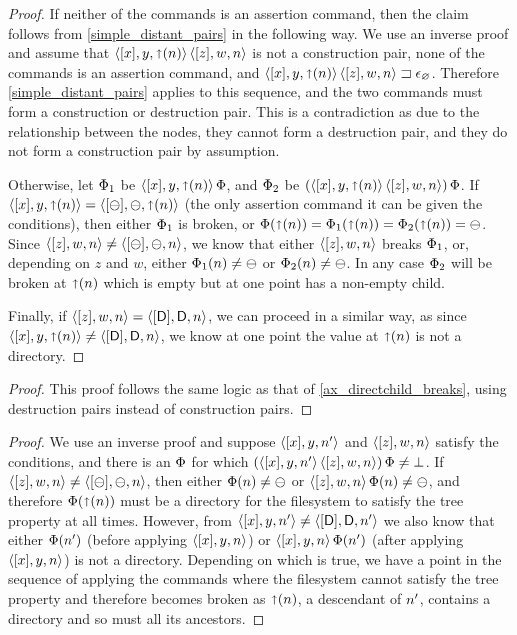\begin{proof}
If neither of the commands is an assertion command, then the claim follows from
\cref{simple_distant_pairs} in the following way.
We use an inverse proof and assume that $\langle{[x],y,\mathord{\shortuparrow}({n})}\rangle\,\langle{[z],w,n}\rangle$ is not a construction pair,
none of the commands is an assertion command, and ${\langle{[x],y,\mathord{\shortuparrow}({n})}\rangle\,\langle{[z],w,n}\rangle}\sqsupset\epsilon_\varnothing$.
Therefore \cref{simple_distant_pairs} applies to this sequence, and the two commands
must form a construction or destruction pair. This is a contradiction as due to
the relationship between the nodes, they cannot form a destruction pair, and
they do not form a construction pair by assumption.

Otherwise, let $\Phi_1$ be $\langle{[x],y,\mathord{\shortuparrow}({n})}\rangle\,\Phi$, and $\Phi_2$ be $(\langle{[x],y,\mathord{\shortuparrow}({n})}\rangle\,\langle{[z],w,n}\rangle)\,\Phi$.
If $\langle{[x],y,\mathord{\shortuparrow}({n})}\rangle=\langle{[\ominus],\ominus,\mathord{\shortuparrow}({n})}\rangle$ (the only assertion command it can be given the conditions),
then either $\Phi_1$ is broken, or
$\Phi(\mathord{\shortuparrow}({n}))=\Phi_1(\mathord{\shortuparrow}({n}))=\Phi_2(\mathord{\shortuparrow}({n}))=\ominus$.
Since $\langle{[z],w,n}\rangle\neq\langle{[\ominus],\ominus,n}\rangle$, we know that either $\langle{[z],w,n}\rangle$ breaks $\Phi_1$,
or, depending on $z$ and $w$, either $\Phi_1(n)\neq\ominus$ or $\Phi_2(n)\neq\ominus$.
In any case $\Phi_2$ will be broken at $\mathord{\shortuparrow}({n})$ which is empty but at one point has a non-empty child.

Finally, if $\langle{[z],w,n}\rangle=\langle{[\mathsf{D}],\mathsf{D},n}\rangle$, we can proceed in a similar way,
as since $\langle{[x],y,\mathord{\shortuparrow}({n})}\rangle\neq\langle{[\mathsf{D}],\mathsf{D},n}\rangle$, we know at one point the value at $\mathord{\shortuparrow}({n})$ is not a directory.
\end{proof}

\begin{myaxproof}
\axaxdirectparentbreaks
\end{myaxproof}

\begin{proof}
This proof follows the same logic as that of \cref{ax_directchild_breaks},
using destruction pairs instead of construction pairs.
\end{proof}

\begin{myaxproof}
\axaxdistantrelbreaks
\end{myaxproof}

\begin{proof}
We use an inverse proof and
suppose $\langle{[x],y,n'}\rangle$ and $\langle{[z],w,n}\rangle$ satisfy the conditions,
and there is an $\Phi$ for which $(\langle{[x],y,n'}\rangle\,\langle{[z],w,n}\rangle)\,\Phi\neq\bot$.
If $\langle{[z],w,n}\rangle\neq\langle{[\ominus],\ominus,n}\rangle$, then either $\Phi(n)\neq\ominus$ or $\langle{[z],w,n}\rangle\,\Phi(n)\neq\ominus$,
and therefore $\Phi(\mathord{\shortuparrow}({n}))$ must be a directory for the filesystem to satisfy
the tree property at all times.
However, from $\langle{[x],y,n'}\rangle\neq\langle{[\mathsf{D}],\mathsf{D},n'}\rangle$ we also know that either $\Phi(n')$ 
(before applying $\langle{[x],y,n}\rangle$) or $\langle{[x],y,n}\rangle\,\Phi(n')$ (after applying $\langle{[x],y,n}\rangle$)
is not a directory. Depending on which is true, we have a point in the sequence
of applying the commands where the filesystem cannot satisfy the tree property
and therefore becomes broken as $\mathord{\shortuparrow}({n})$, a descendant of $n'$, contains
a directory and so must all its ancestors.
\end{proof}

